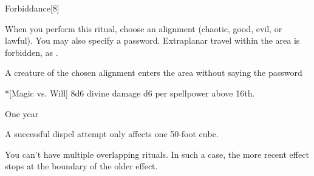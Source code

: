 \begin{spellsection}{Forbiddance}[8]
    \begin{spellheader}
    \end{spellheader}
    \begin{spellcontent}
        \begin{spelltargetinginfo}
        \end{spelltargetinginfo}
        \begin{spelleffects}

            \spellspecial When you perform this ritual, choose an alignment (chaotic, good, evil, or lawful). You may also specify a password.
            \spellline
            \spelleffect Extraplanar travel within the area is forbidden, as .
            \begin{spelltrigger}{A creature of the chosen alignment enters the area without saying the password}
                \begin{spelltarget}*[Magic vs. Will]
                    \spellsuccess 8d6 divine damage \add d6 per spellpower above 16th.
                \end{spelltarget}
            \end{spelltrigger}
            \spelldur One year
        \end{spelleffects}
    \end{spellcontent}
    \begin{spellfooter}
        \spellnotes A successful dispel attempt only affects one 50-foot cube.
        \par You can't have multiple overlapping  rituals. In such a case, the more recent effect stops at the boundary of the older effect.
    \end{spellfooter}
\end{spellsection}


